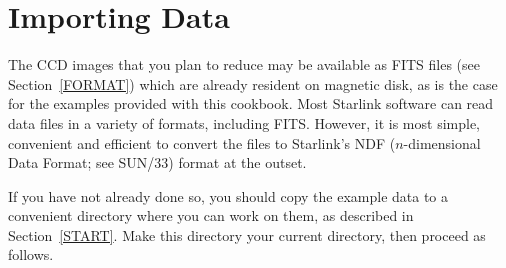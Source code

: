 \documentclass[twoside,11pt]{article}
\newcommand{\xref}[3]{#1}
\newcommand{\xlabel}[1]{}
\begin{document}
\newpage
\section{\xlabel{CONVERSION}\label{CONVERSION}Importing Data}

%

The CCD images that you plan to reduce may be available as FITS files
(see Section~\ref{FORMAT}) which are already resident on magnetic disk,
as is the case for the examples provided with this cookbook.  Most
Starlink software can read data files in a variety of formats, including
FITS.  However, it is most simple, convenient and efficient to convert
the files to Starlink's NDF ($n$-dimensional Data Format; see
\xref{SUN/33}{sun33}{}\cite{SUN33}) format at the outset.

If you have not already done so, you should copy the example data to
a convenient directory where you can work on them, as described in
Section~\ref{START}.  Make this directory your current directory, then
proceed as follows.
\end{document}
